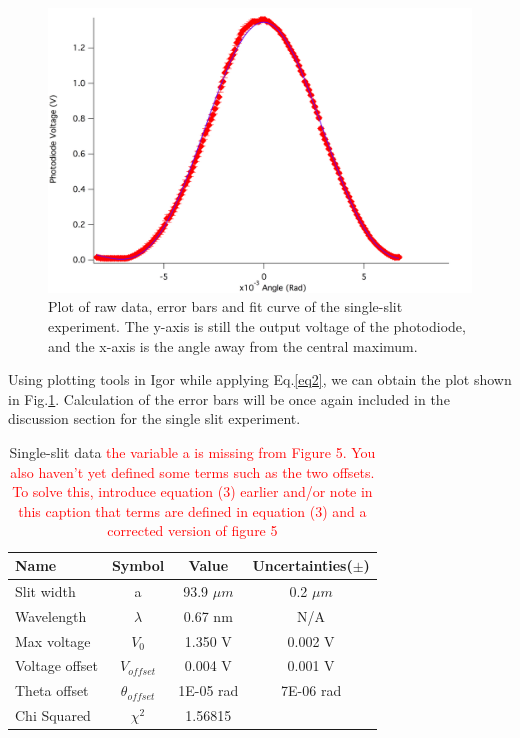 \documentclass[prb,preprint]{revtex4-1}
\begin{document}
\begin{figure}[h]
\centering
\includegraphics[width=6.6in]{single.png}
\caption{Plot of raw data, error bars and fit curve of the single-slit experiment. The y-axis is still the output voltage of the photodiode, and the x-axis is the angle away from the central maximum.}
\label{single}
\end{figure}

Using plotting tools in Igor while applying Eq.\ref{eq2}, we can obtain the plot shown in Fig.\ref{single}. Calculation of the error bars will be once again included in the discussion section for the single slit experiment.

\begin{table}[h]
\centering
\caption{Single-slit data \textcolor{red}{the variable a is missing from Figure 5. You also haven't yet defined some terms such as the two offsets. To solve this, introduce equation (3) earlier and/or note in this caption that terms are defined in equation (3) and a corrected version of figure 5  }}
\begin{ruledtabular}
\begin{tabular}{ l c c c}
Name & Symbol & Value & Uncertainties($\pm$)\\
\hline
Slit width & a & 93.9 $\mu m$ & 0.2 $\mu m$\\
Wavelength & $\lambda$ & 0.67 nm & N/A \\
Max voltage & $V_0$ & 1.350 V & 0.002 V\\
Voltage offset & $V_{offset}$ &  0.004 V & 0.001 V\\
Theta offset &$ \theta_{offset}$ & 1E-05 rad & 7E-06 rad \\

\hline
Chi Squared & $\chi^2$ & 1.56815 &
\end{tabular}
\end{ruledtabular}
\label{data}
\end{table}
\end{document}
